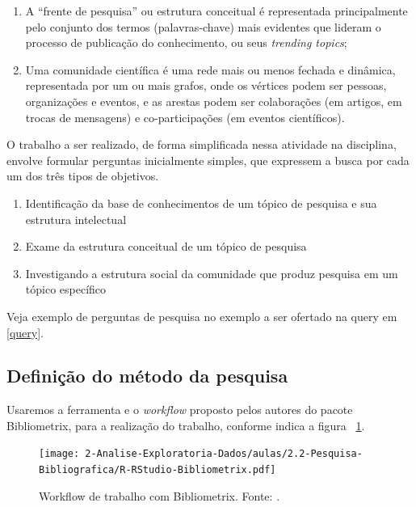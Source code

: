 \begin{enumerate}
    \item A ``frente de pesquisa'' ou estrutura conceitual é representada principalmente pelo conjunto dos termos (palavras-chave) mais evidentes que lideram o processo de publicação do conhecimento, ou seus \textit{trending topics};
    \item Uma comunidade científica é uma rede mais ou menos fechada e dinâmica, representada por um ou mais grafos, onde os vértices podem ser pessoas, organizações e eventos, e as arestas podem ser colaborações (em artigos, em trocas de mensagens) e co-participações (em eventos científicos).
\end{enumerate}

O trabalho a ser realizado, de forma simplificada nessa atividade na disciplina, envolve  formular perguntas inicialmente simples, que expressem a busca por cada um dos três tipos de objetivos.

\begin{enumerate}
\item Identificação da base de conhecimentos de um tópico de pesquisa e sua estrutura intelectual

\item Exame da estrutura conceitual de um tópico de pesquisa

\item Investigando a estrutura social da comunidade que produz pesquisa em um tópico específico
\end{enumerate}

Veja exemplo de perguntas de pesquisa no exemplo a ser ofertado na query em \ref{query}.

\subsection{Definição do método da pesquisa}

Usaremos a ferramenta e o \textit{workflow} proposto pelos autores do pacote Bibliometrix, para a realização do trabalho, conforme indica a figura ~\ref{fig:bibliometrix:workflow}.

\begin{figure}
    \centering
\texttt{[image: 2-Analise-Exploratoria-Dados/aulas/2.2-Pesquisa-Bibliografica/R-RStudio-Bibliometrix.pdf]}
    \caption{Workflow de trabalho com Bibliometrix. Fonte: \citep{aria_bibliometrix_2017}.\label{fig:bibliometrix:workflow}}
    
\end{figure}

